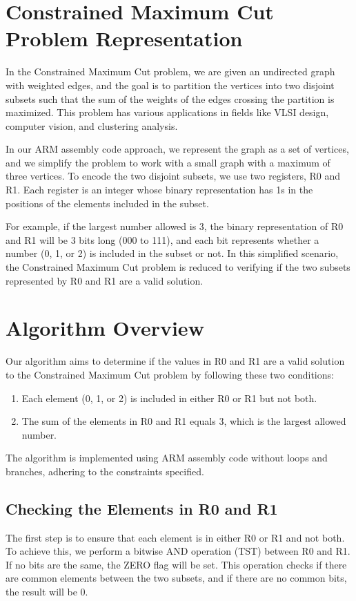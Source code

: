 \section{Constrained Maximum Cut Problem Representation}
In the Constrained Maximum Cut problem, we are given an undirected graph with weighted edges, and the goal is to partition the vertices into two disjoint subsets such that the sum of the weights of the edges crossing the partition is maximized. This problem has various applications in fields like VLSI design, computer vision, and clustering analysis.

In our ARM assembly code approach, we represent the graph as a set of vertices, and we simplify the problem to work with a small graph with a maximum of three vertices. To encode the two disjoint subsets, we use two registers, R0 and R1. Each register is an integer whose binary representation has 1s in the positions of the elements included in the subset.

For example, if the largest number allowed is 3, the binary representation of R0 and R1 will be 3 bits long (000 to 111), and each bit represents whether a number (0, 1, or 2) is included in the subset or not. In this simplified scenario, the Constrained Maximum Cut problem is reduced to verifying if the two subsets represented by R0 and R1 are a valid solution.

\section{Algorithm Overview}
Our algorithm aims to determine if the values in R0 and R1 are a valid solution to the Constrained Maximum Cut problem by following these two conditions:
\begin{enumerate}
    \item Each element (0, 1, or 2) is included in either R0 or R1 but not both.
    \item The sum of the elements in R0 and R1 equals 3, which is the largest allowed number.
\end{enumerate}

The algorithm is implemented using ARM assembly code without loops and branches, adhering to the constraints specified.

\subsection{Checking the Elements in R0 and R1}
The first step is to ensure that each element is in either R0 or R1 and not both. To achieve this, we perform a bitwise AND operation (TST) between R0 and R1. If no bits are the same, the ZERO flag will be set. This operation checks if there are common elements between the two subsets, and if there are no common bits, the result will be 0.

